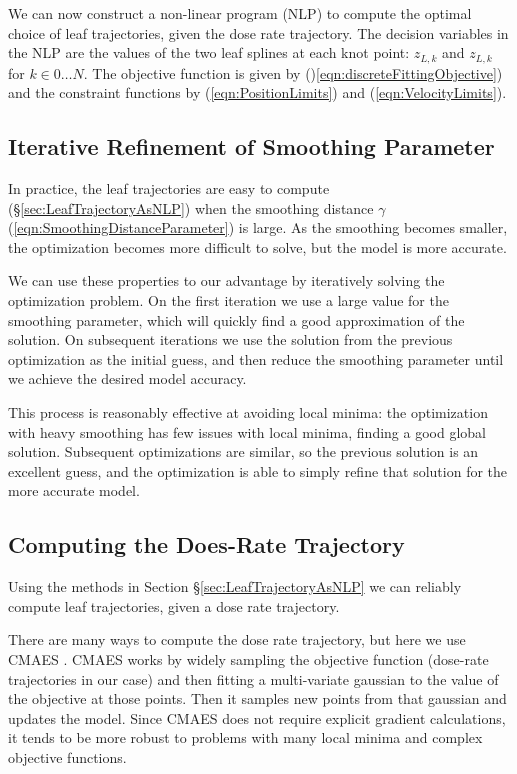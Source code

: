We can now construct a non-linear program (NLP) to compute the optimal choice of leaf trajectories,
given the dose rate trajectory.
The decision variables in the NLP are the values of the two leaf splines at each knot point:
$z_{L, k}$ and $z_{L, k}$ for $k \in 0 \dots N$.
The objective function is given by ()\ref{eqn:discreteFittingObjective})
 and the constraint functions by (\ref{eqn:PositionLimits}) and (\ref{eqn:VelocityLimits}).

\subsection{Iterative Refinement of Smoothing Parameter}

In practice, the leaf trajectories are easy to compute (\S\ref{sec:LeafTrajectoryAsNLP})
when the smoothing distance $\gamma$ (\ref{eqn:SmoothingDistanceParameter}) is large.
As the smoothing becomes smaller, the optimization becomes more difficult to solve,
but the model is more accurate.

We can use these properties to our advantage by iteratively solving the optimization problem.
On the first iteration we use a large value for the smoothing parameter,
which will quickly find a good approximation of the solution.
On subsequent iterations we use the solution from the previous optimization as the initial guess,
and then reduce the smoothing parameter until we achieve the desired model accuracy.

This process is reasonably effective at avoiding local minima:
the optimization with heavy smoothing has few issues with local minima, finding a good global solution.
Subsequent optimizations are similar, so the previous solution is an excellent guess, and the optimization
is able to simply refine that solution for the more accurate model.


\subsection{Computing the Does-Rate Trajectory}

Using the methods in Section \S \ref{sec:LeafTrajectoryAsNLP} we can reliably compute leaf
trajectories, given a dose rate trajectory.

There are many ways to compute the dose rate trajectory, but here we use CMAES \cite{Hansen2001}.
CMAES works by widely sampling the objective function (dose-rate trajectories in our case) and then
fitting a multi-variate gaussian to the value of the objective at those points.
Then it samples new points from that gaussian and updates the model.
Since CMAES does not require explicit gradient calculations, it tends to be more robust to problems
with many local minima and complex objective functions.


